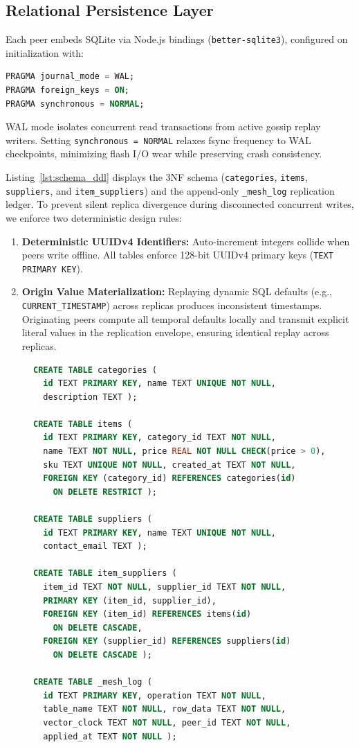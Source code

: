 \subsection{Relational Persistence Layer}
Each peer embeds SQLite via Node.js bindings (\texttt{better-sqlite3}), configured on initialization with:
\begin{lstlisting}[language=SQL]
PRAGMA journal_mode = WAL;
PRAGMA foreign_keys = ON;
PRAGMA synchronous = NORMAL;
\end{lstlisting}
WAL mode isolates concurrent read transactions from active gossip replay writers. Setting \texttt{synchronous = NORMAL} relaxes fsync frequency to WAL checkpoints, minimizing flash I/O wear while preserving crash consistency.

Listing~\ref{lst:schema_ddl} displays the 3NF schema (\texttt{categories}, \texttt{items}, \texttt{suppliers}, and \texttt{item\_suppliers}) and the append-only \texttt{\_mesh\_log} replication ledger. To prevent silent replica divergence during disconnected concurrent writes, we enforce two deterministic design rules:
\begin{enumerate}
    \item \textbf{Deterministic UUIDv4 Identifiers:} Auto-increment integers collide when peers write offline. All tables enforce 128-bit UUIDv4 primary keys (\texttt{TEXT PRIMARY KEY}).
    \item \textbf{Origin Value Materialization:} Replaying dynamic SQL defaults (e.g., \texttt{CURRENT\_TIMESTAMP}) across replicas produces inconsistent timestamps. Originating peers compute all temporal defaults locally and transmit explicit literal values in the replication envelope, ensuring identical replay across replicas.
\end{enumerate}

\begin{figure}[!t]
\begin{lstlisting}[language=SQL, caption={Relational Schema and Mesh Ledger DDL}, label={lst:schema_ddl}]
CREATE TABLE categories (
  id TEXT PRIMARY KEY, name TEXT UNIQUE NOT NULL,
  description TEXT );

CREATE TABLE items (
  id TEXT PRIMARY KEY, category_id TEXT NOT NULL,
  name TEXT NOT NULL, price REAL NOT NULL CHECK(price > 0),
  sku TEXT UNIQUE NOT NULL, created_at TEXT NOT NULL,
  FOREIGN KEY (category_id) REFERENCES categories(id)
    ON DELETE RESTRICT );

CREATE TABLE suppliers (
  id TEXT PRIMARY KEY, name TEXT UNIQUE NOT NULL,
  contact_email TEXT );

CREATE TABLE item_suppliers (
  item_id TEXT NOT NULL, supplier_id TEXT NOT NULL,
  PRIMARY KEY (item_id, supplier_id),
  FOREIGN KEY (item_id) REFERENCES items(id)
    ON DELETE CASCADE,
  FOREIGN KEY (supplier_id) REFERENCES suppliers(id)
    ON DELETE CASCADE );

CREATE TABLE _mesh_log (
  id TEXT PRIMARY KEY, operation TEXT NOT NULL,
  table_name TEXT NOT NULL, row_data TEXT NOT NULL,
  vector_clock TEXT NOT NULL, peer_id TEXT NOT NULL,
  applied_at TEXT NOT NULL );
\end{lstlisting}
\vspace{-1.2em}
\end{figure}

